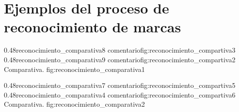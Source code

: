 
\chapter{Ejemplos del proceso de reconocimiento de marcas} %
\label{AppendixA} %


\subfigab
         {0.48}{reconocimiento_comparativa8} {comentario}{fig:reconocimiento_compartiva3}
         {0.48}{reconocimiento_comparativa9} {comentario}{fig:reconocimiento_compartiva2}
         {Comparativa.}
         {fig:reconocimiento_comparativa1}

\subfigab
         {0.48}{reconocimiento_comparativa7} {comentario}{fig:reconocimiento_compartiva5}
         {0.48}{reconocimiento_comparativa4} {comentario}{fig:reconocimiento_compartiva6}
         {Comparativa.}
         {fig:reconocimiento_comparativa2}



